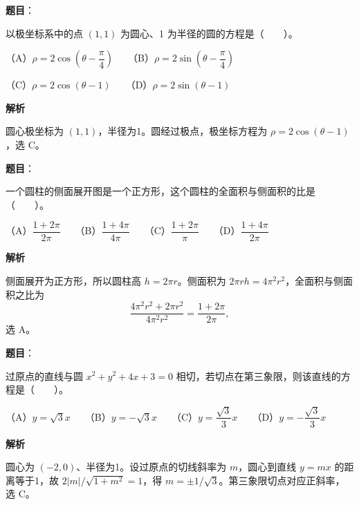 \begin{answer}

\textbf{题目}：

以极坐标系中的点 $(1,1)$ 为圆心、1 为半径的圆的方程是\mbox{（　　）}。

（A）$\rho=2\cos\left(\theta-\dfrac{\pi}{4}\right)$　　（B）$\rho=2\sin\left(\theta-\dfrac{\pi}{4}\right)$

（C）$\rho=2\cos(\theta-1)$　　（D）$\rho=2\sin(\theta-1)$

\textbf{解析}

圆心极坐标为 $(1,1)$，半径为1。圆经过极点，极坐标方程为 $\rho=2\cos(\theta-1)$，选 C。


\end{answer}
\begin{answer}

\textbf{题目}：

一个圆柱的侧面展开图是一个正方形，这个圆柱的全面积与侧面积的比是\mbox{（　　）}。

（A）$\dfrac{1+2\pi}{2\pi}$　　（B）$\dfrac{1+4\pi}{4\pi}$　　（C）$\dfrac{1+2\pi}{\pi}$　　（D）$\dfrac{1+4\pi}{2\pi}$

\textbf{解析}

侧面展开为正方形，所以圆柱高 $h=2\pi r$。侧面积为 $2\pi r h=4\pi^2r^2$，全面积与侧面积之比为
\nopagebreak[4]
\[
\frac{4\pi^2r^2+2\pi r^2}{4\pi^2r^2}=\frac{1+2\pi}{2\pi},
\]
选 A。


\end{answer}
\begin{answer}

\textbf{题目}：

过原点的直线与圆 $x^2+y^2+4x+3=0$ 相切，若切点在第三象限，则该直线的方程是\mbox{（　　）}。

（A）$y=\sqrt{3}x$　　（B）$y=-\sqrt{3}x$　　（C）$y=\dfrac{\sqrt{3}}{3}x$　　（D）$y=-\dfrac{\sqrt{3}}{3}x$

\textbf{解析}

圆心为 $(-2,0)$、半径为1。设过原点的切线斜率为 $m$，圆心到直线 $y=mx$ 的距离等于1，故 $2|m|/\sqrt{1+m^2}=1$，得 $m=\pm1/\sqrt3$。第三象限切点对应正斜率，选 C。


\end{answer}
